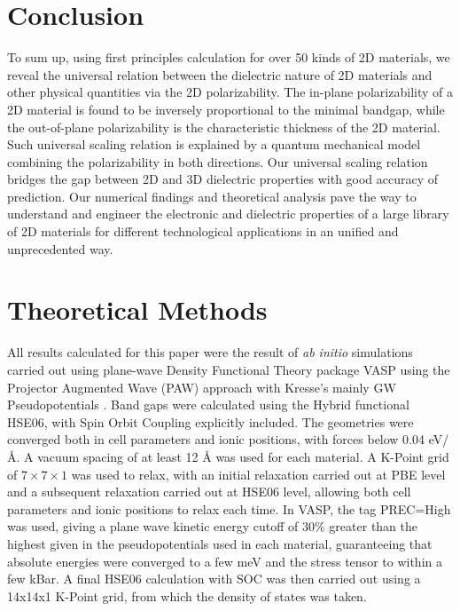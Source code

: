 \documentclass[journal=ancac3,manuscript=article,email=true,hyperref=true,keywords=false]{achemso}
\begin{document}
\section{Conclusion}
\label{sec:org5fd1f1a}

To sum up, using first principles calculation for over 50 kinds of 2D
materials, we reveal the universal relation between the dielectric
nature of 2D materials and other physical quantities via the 2D
polarizability. The in-plane polarizability of a 2D material is found
to be inversely proportional to the minimal bandgap, while the
out-of-plane polarizability is the characteristic thickness of the 2D
material. Such universal scaling relation is explained by a quantum
mechanical model combining the polarizability in both directions. Our
universal scaling relation bridges the gap between 2D and 3D
dielectric properties with good accuracy of prediction.  Our numerical
findings and theoretical analysis pave the way to understand and
engineer the electronic and dielectric properties of a large library
of 2D materials for different technological applications in an
unified and unprecedented way.

\section{Theoretical Methods}
\label{sec:org8457dbb}

All results calculated for this paper were the result of \emph{ab initio}
simulations carried out using plane-wave Density Functional Theory
package VASP \cite{Kresse_1993,Kresse_1996_1,Kresse_1996_2} using the
Projector Augmented Wave (PAW) approach with Kresse’s mainly GW
Pseudopotentials \cite{Kresse_1999_pseudopotentials}. Band gaps were
calculated using the Hybrid functional HSE06, with Spin Orbit Coupling
explicitly included. The geometries were converged both in cell
parameters and ionic positions, with forces below 0.04 eV/Å. A vacuum
spacing of at least 12 Å was used for each material. A K-Point grid of
\(7\times7\times1\) was used to relax, with an initial relaxation
carried out at PBE level and a subsequent relaxation carried out at
HSE06 level, allowing both cell parameters and ionic positions to
relax each time. In VASP, the tag PREC=High was used, giving a plane
wave kinetic energy cutoff of 30\% greater than the highest given in
the pseudopotentials used in each material, guaranteeing that absolute
energies were converged to a few meV and the stress tensor to within a
few kBar. A final HSE06 calculation with SOC was then carried out
using a 14x14x1 K-Point grid, from which the density of states was
taken.
\end{document}
